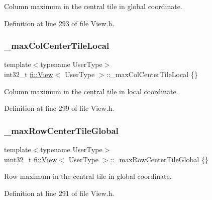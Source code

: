 Column maximum in the central tile in global coordinate. 



Definition at line 293 of file View.\+h.

\mbox{\label{classfi_1_1View_ab13cc15a780703ce9854a3a01f744f89}} 
\subsubsection{\texorpdfstring{\+\_\+max\+Col\+Center\+Tile\+Local}{\_maxColCenterTileLocal}}
{\footnotesize\ttfamily template$<$typename User\+Type$>$ \\
int32\+\_\+t \hyperlink{classfi_1_1View}{fi\+::\+View}$<$ User\+Type $>$\+::\+\_\+max\+Col\+Center\+Tile\+Local \{\}\hspace{0.3cm}{\ttfamily [private]}}



Column maximum in the central tile in local coordinate. 



Definition at line 299 of file View.\+h.

\mbox{\label{classfi_1_1View_add201fdbd6c6975e38ae826e11afaa78}} 
\subsubsection{\texorpdfstring{\+\_\+max\+Row\+Center\+Tile\+Global}{\_maxRowCenterTileGlobal}}
{\footnotesize\ttfamily template$<$typename User\+Type$>$ \\
uint32\+\_\+t \hyperlink{classfi_1_1View}{fi\+::\+View}$<$ User\+Type $>$\+::\+\_\+max\+Row\+Center\+Tile\+Global \{\}\hspace{0.3cm}{\ttfamily [private]}}



Row maximum in the central tile in global coordinate. 



Definition at line 291 of file View.\+h.

